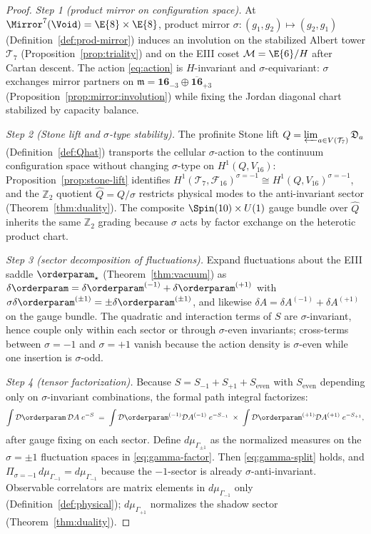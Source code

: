 \begin{proof}
\emph{Step 1 (product mirror on configuration space).}
At $\Mirror^7(\Void)=\E{8}\times\E{8}$, product mirror
$\sigma:(g_1,g_2)\mapsto(g_2,g_1)$
(Definition~\ref{def:prod-mirror}) induces an involution on the stabilized
Albert tower $\mathcal{T}_7$ (Proposition~\ref{prop:triality}) and on the
EIII coset $\mathcal{M}=\E{6}/H$ after Cartan descent. The action
\eqref{eq:action} is $H$-invariant and $\sigma$-equivariant: $\sigma$ exchanges
mirror partners on $\mathfrak{m}=\mathbf{16}_{-3}\oplus\overline{\mathbf{16}}_{+3}$
(Proposition~\ref{prop:mirror:involution}) while fixing the Jordan diagonal
chart stabilized by capacity balance.

\emph{Step 2 (Stone lift and $\sigma$-type stability).}
The profinite Stone lift $Q=\varprojlim_{a\in V(\mathcal{T}_7)}\mathfrak{D}_a$
(Definition~\ref{def:Qhat}) transports the cellular $\sigma$-action to the
continuum configuration space without changing $\sigma$-type on
$H^1(Q,V_{16})$: Proposition~\ref{prop:stone-lift} identifies
$H^1(\mathcal{T}_7,\mathcal{F}_{16})^{\sigma=-1}\cong
H^1(Q,V_{16})^{\sigma=-1}$, and the $\mathbb{Z}_2$ quotient
$\hat Q=Q/\sigma$ restricts physical modes to the anti-invariant sector
(Theorem~\ref{thm:duality}). The composite
$\Spin(10)\times U(1)$ gauge bundle over $\hat Q$ inherits the same
$\mathbb{Z}_2$ grading because $\sigma$ acts by factor exchange on the
heterotic product chart.

\emph{Step 3 (sector decomposition of fluctuations).}
Expand fluctuations about the EIII saddle $\orderparam_\star$
(Theorem~\ref{thm:vacuum}) as
$\delta\orderparam=\delta\orderparam^{(-1)}+\delta\orderparam^{(+1)}$ with
$\sigma\delta\orderparam^{(\pm1)}=\pm\delta\orderparam^{(\pm1)}$, and likewise
$\delta A=\delta A^{(-1)}+\delta A^{(+1)}$ on the gauge bundle.
The quadratic and interaction terms of $S$ are $\sigma$-invariant, hence
couple only within each sector or through $\sigma$-even invariants; cross-terms
between $\sigma=-1$ and $\sigma=+1$ vanish because the action density is
$\sigma$-even while one insertion is $\sigma$-odd.

\emph{Step 4 (tensor factorization).}
Because $S=S_{-1}+S_{+1}+S_{\mathrm{even}}$ with $S_{\mathrm{even}}$ depending
only on $\sigma$-invariant combinations, the formal path integral factorizes:
\begin{equation}\label{eq:gamma-factor}
  \int \mathcal{D}\orderparam\,\mathcal{D}A\;
  e^{-S}
  \;=\;
  \int \mathcal{D}\orderparam^{(-1)}\mathcal{D}A^{(-1)}\;
  e^{-S_{-1}}
  \;\times\;
  \int \mathcal{D}\orderparam^{(+1)}\mathcal{D}A^{(+1)}\;
  e^{-S_{+1}},
\end{equation}
after gauge fixing on each sector. Define $d\mu_{\Gamma_{\pm1}}$ as the
normalized measures on the $\sigma=\pm1$ fluctuation spaces in
\eqref{eq:gamma-factor}. Then \eqref{eq:gamma-split} holds, and
$\Pi_{\sigma=-1}\,d\mu_{\Gamma_{-1}}=d\mu_{\Gamma_{-1}}$ because the
$-1$-sector is already $\sigma$-anti-invariant. Observable correlators are
matrix elements in $d\mu_{\Gamma_{-1}}$ only (Definition~\ref{def:physical});
$d\mu_{\Gamma_{+1}}$ normalizes the shadow sector
(Theorem~\ref{thm:duality}).
\end{proof}

